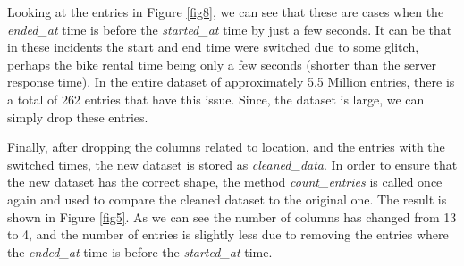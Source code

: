 \documentclass[12pt]{article}
\begin{document}
\begin{itemize}
Looking at the entries in Figure \ref{fig8}, we can see that these are cases when the \textit{ended\_at} time is before the \textit{started\_at} time by just a few seconds. It can be that in these incidents the start and end time were switched due to some glitch, perhaps the bike rental time being only a few seconds (shorter than the server response time). In the entire dataset of approximately 5.5 Million entries, there is a total of 262 entries that have this issue. Since, the dataset is large, we can simply drop these entries.


Finally, after dropping the columns related to location, and the entries with the switched times, the new dataset is stored as \textit{cleaned\_data}. In order to ensure that the new dataset has the correct shape, the method \textit{count\_entries} is called once again and used to compare the cleaned dataset to the original one. The result is shown in Figure \ref{fig5}. As we can see the number of columns has changed from 13 to 4, and the number of entries is slightly less due to removing the entries where the \textit{ended\_at} time is before the \textit{started\_at} time. 
	

\end{itemize}
\end{document}
